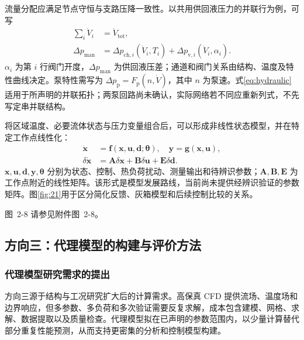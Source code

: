 \documentclass[UTF8]{midterm}
\makeatletter
\newcommand{\submissionnumber}[1]{\def\@currentlabel{#1}}
\makeatother
\begin{document}
流量分配应满足节点守恒与支路压降一致性。以共用供回液压力的并联行为例，可写
\begin{equation}\begin{aligned}
\sum_i\dot V_i&=\dot V_{\mathrm{tot}},\\
\Delta p_{\mathrm{man}}&=\Delta p_{\mathrm{ch},i}(\dot V_i,T_i)
+\Delta p_{\mathrm{v},i}(\dot V_i,\alpha_i).
\end{aligned}\label{eq:hydraulic}
\end{equation}
$\alpha_i$ 为第 $i$ 行阀门开度，$\Delta p_{\mathrm{man}}$ 为供回液压差；通道和阀门关系由结构、温度及特性曲线决定。泵特性需写为 $\Delta p_{\mathrm p}=F_{\mathrm p}(n,\dot V)$，其中 $n$ 为泵速。式\eqref{eq:hydraulic}适用于所声明的并联拓扑；两泵回路尚未确认，实际网络若不同应重新列式，不先写定串并联结构。

将区域温度、必要流体状态与压力变量组合后，可以形成非线性状态模型，并在特定工作点线性化：
\begin{equation}\begin{aligned}
\dot{\bm x}&=\bm f(\bm x,\bm u,\bm d;\bm\theta),\quad\bm y=\bm g(\bm x,\bm u),\\
\delta\dot{\bm x}&=\bm A\delta\bm x+\bm B\delta\bm u+\bm E\delta\bm d.
\end{aligned}\label{eq:state}
\end{equation}
$\bm x,\bm u,\bm d,\bm y,\bm\theta$ 分别为状态、控制、热负荷扰动、测量输出和待辨识参数；$\bm A,\bm B,\bm E$ 为工作点附近的线性矩阵。该形式是模型发展路线，当前尚未提供经辨识验证的参数矩阵。图\ref{fig:21}用于区分简化反馈、灰箱模型和后续控制比较的关系。

\par\noindent \begingroup\submissionnumber{2-8}\label{fig:21}\endgroup 图~2-8 请参见附件图~2-8。\par


\subsection{方向三：代理模型的构建与评价方法}
\subsubsection{代理模型研究需求的提出}
方向三源于结构与工况研究扩大后的计算需求。高保真 CFD 提供流场、温度场和边界响应，但多参数、多负荷和多次验证需要反复求解，成本包含建模、网格、求解、数据提取以及质量检查。代理模型拟在已声明的参数范围内，以少量计算替代部分重复性能预测，从而支持更密集的分析和控制模型构建。
\end{document}
